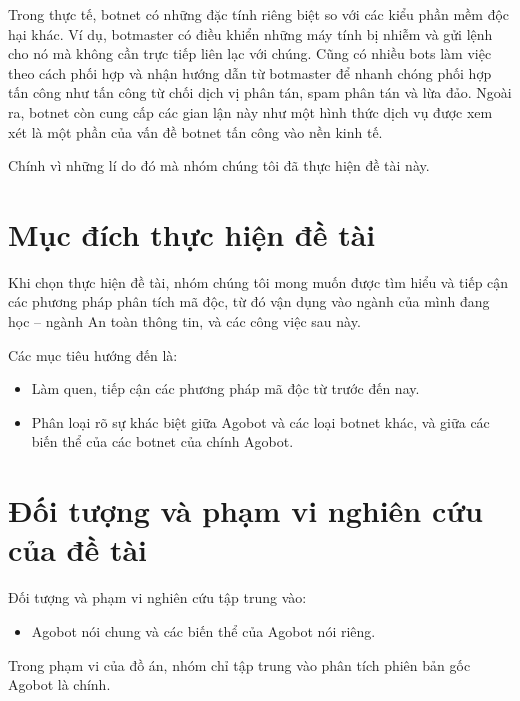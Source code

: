 Trong thực tế, botnet có những đặc tính riêng biệt so với các kiểu phần mềm độc hại
khác. Ví dụ, botmaster có điều khiển những máy tính bị nhiễm và gửi lệnh cho nó mà
không cần trực tiếp liên lạc với chúng. Cũng có nhiều bots làm việc theo cách phối hợp
và nhận hướng dẫn từ botmaster để nhanh chóng phối hợp tấn công như tấn công từ chối
dịch vị phân tán, spam phân tán và lừa đảo. Ngoài ra, botnet còn cung cấp các gian lận
này như một hình thức dịch vụ được xem xét là một phần của vấn đề botnet tấn công vào
nền kinh tế.

Chính vì những lí do đó mà nhóm chúng tôi đã thực hiện đề tài này.

\section*{Mục đích thực hiện đề tài}
Khi chọn thực hiện đề tài, nhóm chúng tôi mong muốn được tìm hiểu và tiếp cận các
phương pháp phân tích mã độc, từ đó vận dụng vào ngành của mình đang học – ngành
An toàn thông tin, và các công việc sau này.

Các mục tiêu hướng đến là:

\begin{itemize}
\item Làm quen, tiếp cận các phương pháp mã độc từ trước đến nay.
\item Phân loại rõ sự khác biệt giữa Agobot và các loại botnet khác, và giữa các biến
thể của các botnet của chính Agobot.
\end{itemize}

\section*{Đối tượng và phạm vi nghiên cứu của đề tài}
Đối tượng và phạm vi nghiên cứu tập trung vào:

\begin{itemize}
\item Agobot nói chung và các biến thể của Agobot nói riêng.
\end{itemize}

Trong phạm vi của đồ án, nhóm chỉ tập trung vào phân tích phiên bản gốc Agobot là
chính.
